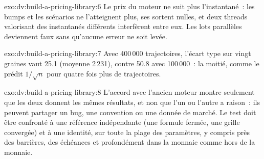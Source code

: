 \begin{solution}{exo:dv:build-a-pricing-library:6}
Le prix du moteur ne suit plus l'instantané~: les bumps et les scénarios ne l'atteignent plus, ses  sortent nulles, et deux threads valorisant des instantanés différents
interfèrent entre eux. Les lots parallèles deviennent faux sans qu'aucune erreur ne soit levée.
\end{solution}

\begin{solution}{exo:dv:build-a-pricing-library:7}
Avec 400\,000 trajectoires, l'écart type sur vingt graines vaut 25.1 (moyenne 2\,231), contre 50.8 avec 100\,000~: la moitié, comme le prédit $1/\sqrt n$ pour quatre fois plus de trajectoires.
\end{solution}

\begin{solution}{exo:dv:build-a-pricing-library:8}
L'accord avec l'ancien moteur montre seulement que les deux donnent les mêmes résultats, et non que l'un ou l'autre a raison~: ils peuvent partager un bug, une convention ou une donnée de marché. Le test doit
être confronté à une référence indépendante (une formule fermée, une grille convergée) et à une identité, sur toute la plage des paramètres, y compris près des barrières, des échéances
et profondément dans la monnaie comme hors de la monnaie.
\end{solution}


